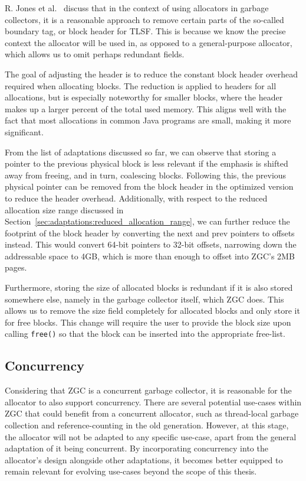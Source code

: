 R. Jones et al.~\cite[Page 103]{gchandbook} discuss that in the context of using allocators in garbage collectors, it is a reasonable approach to remove certain parts of the so-called boundary tag, or block header for TLSF. This is because we know the precise context the allocator will be used in, as opposed to a general-purpose allocator, which allows us to omit perhaps redundant fields.

The goal of adjusting the header is to reduce the constant block header overhead required when allocating blocks. The reduction is applied to headers for all allocations, but is especially noteworthy for smaller blocks, where the header makes up a larger percent of the total used memory. This aligns well with the fact that most allocations in common Java programs are small, making it more significant.

From the list of adaptations discussed so far, we can observe that storing a pointer to the previous physical block is less relevant if the emphasis is shifted away from freeing, and in turn, coalescing blocks. Following this, the previous physical pointer can be removed from the block header in the optimized version to reduce the header overhead. Additionally, with respect to the reduced allocation size range discussed in Section~\ref{sec:adaptations:reduced_allocation_range}, we can further reduce the footprint of the block header by converting the next and prev pointers to offsets instead. This would convert 64-bit pointers to 32-bit offsets, narrowing down the addressable space to 4GB, which is more than enough to offset into ZGC's 2MB pages.

Furthermore, storing the size of allocated blocks is redundant if it is also stored somewhere else, namely in the garbage collector itself, which ZGC does. This allows us to remove the size field completely for allocated blocks and only store it for free blocks. This change will require the user to provide the block size upon calling \texttt{free()} so that the block can be inserted into the appropriate free-list.

\subsection{Concurrency}

Considering that ZGC is a concurrent garbage collector, it is reasonable for the allocator to also support concurrency. There are several potential use-cases within ZGC that could benefit from a concurrent allocator, such as thread-local garbage collection and reference-counting in the old generation. However, at this stage, the allocator will not be adapted to any specific use-case, apart from the general adaptation of it being concurrent. By incorporating concurrency into the allocator's design alongside other adaptations, it becomes better equipped to remain relevant for evolving use-cases beyond the scope of this thesis.

